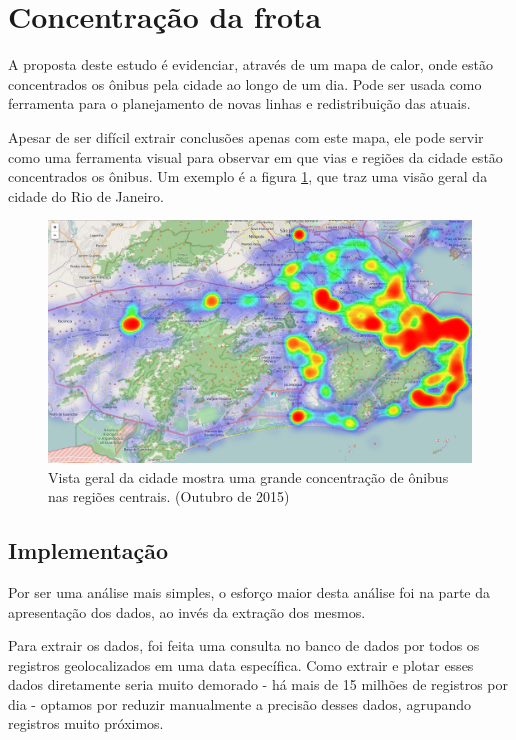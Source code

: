 \section{Concentração da frota}

A proposta deste estudo é evidenciar, através de um mapa de calor, onde estão concentrados os ônibus pela cidade ao longo de um dia. Pode ser usada como ferramenta para o planejamento de novas linhas e redistribuição das atuais. 

Apesar de ser difícil extrair conclusões apenas com este mapa, ele pode servir como uma ferramenta visual para observar em que vias e regiões da cidade estão concentrados os ônibus. Um exemplo é a figura \ref{fig:LABEL_FIG_ANALISE_CONCENTRACAO_CIDADE}, que traz uma visão geral da cidade do Rio de Janeiro.

\begin{figure}
  \centering
  \includegraphics[width=1.0\textwidth]{imagens/heat_map1.png}
  \caption{Vista geral da cidade mostra uma grande concentração de ônibus nas regiões centrais. (Outubro de 2015)}
  \label{fig:LABEL_FIG_ANALISE_CONCENTRACAO_CIDADE}
\end{figure}


\subsection{Implementação}

Por ser uma análise mais simples, o esforço maior desta análise foi na parte da apresentação dos dados, ao invés da extração dos mesmos. 

Para extrair os dados, foi feita uma consulta no banco de dados por todos os registros geolocalizados em uma data específica. Como extrair e plotar esses dados diretamente seria muito demorado - há mais de 15 milhões de registros por dia - optamos por reduzir manualmente a precisão desses dados, agrupando registros muito próximos.

